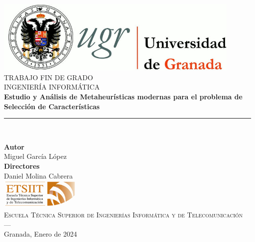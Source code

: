 \begin{titlepage}
 
 
\newlength{\centeroffset}
\setlength{\centeroffset}{-0.5\oddsidemargin}
\addtolength{\centeroffset}{0.5\evensidemargin}
\thispagestyle{empty}

\noindent\hspace*{\centeroffset}\begin{minipage}{\textwidth}

\centering
\includegraphics[width=0.9\textwidth]{imagenes/logo_ugr.jpg}\\[1.4cm]

\textsc{ \Large TRABAJO FIN DE GRADO\\[0.2cm]}
\textsc{ INGENIERÍA INFORMÁTICA}\\[1cm]
% 
{\Huge\bfseries Estudio y Análisis de Metaheurísticas modernas para el problema de Selección de Características\\
}
\noindent\rule[-1ex]{\textwidth}{3pt}\\[3.5ex]
\end{minipage}

\vspace{1.4cm}
\noindent\hspace*{\centeroffset}\begin{minipage}{\textwidth}
\centering

\textbf{Autor}\\ {Miguel García López}\\[2.5ex]
\textbf{Directores}\\
{Daniel Molina Cabrera}\\[2cm]
\includegraphics[width=0.3\textwidth]{imagenes/etsiit_logo.png}\\[0.1cm]
\textsc{Escuela Técnica Superior de Ingenierías Informática y de Telecomunicación}\\
\textsc{---}\\
Granada, Enero de 2024
\end{minipage}
\end{titlepage}

